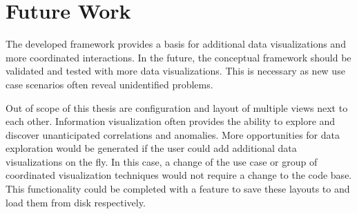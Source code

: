 \section{Future Work}

The developed \cmv{} framework provides a basis for additional data visualizations and more coordinated interactions.
In the future, the conceptual framework should be validated and tested with more data visualizations.
This is necessary as new use case scenarios often reveal unidentified problems.

Out of scope of this thesis are configuration and layout of multiple views next to each other.
Information visualization often provides the ability to explore and discover unanticipated correlations and anomalies.
More opportunities for data exploration would be generated if the user could add additional data visualizations on the fly.
In this case, a change of the use case or group of coordinated visualization techniques would not require a change to the code base.
This functionality could be completed with a feature to save these layouts to and load them from disk respectively.

